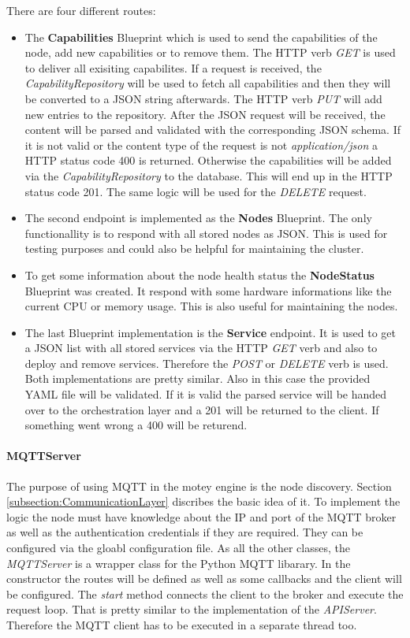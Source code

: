 There are four different routes:
\begin{itemize}
  \item The \textbf{Capabilities} Blueprint which is used to send the capabilities of the node, add new capabilities or to remove them.
  The \ac{HTTP} verb \textit{GET} is used to deliver all exisiting capabilites.
  If a request is received, the \textit{CapabilityRepository} will be used to fetch all capabilities and then they will be converted to a JSON string afterwards.
  The \ac{HTTP} verb \textit{PUT} will add new entries to the repository.
  After the \ac{JSON} request will be received, the content will be parsed and validated with the corresponding \ac{JSON} schema.
  If it is not valid or the content type of the request is not \textit{application/json} a \ac{HTTP} status code 400 is returned.
  Otherwise the capabilities will be added via the \textit{CapabilityRepository} to the database.
  This will end up in the \ac{HTTP} status code 201.
  The same logic will be used for the \textit{DELETE} request.
  \item The second endpoint is implemented as the \textbf{Nodes} Blueprint.
  The only functionallity is to respond with all stored nodes as \ac{JSON}.
  This is used for testing purposes and could also be helpful for maintaining the cluster.
  \item To get some information about the node health status the \textbf{NodeStatus} Blueprint was created.
  It respond with some hardware informations like the current \ac{CPU} or memory usage.
  This is also useful for maintaining the nodes.
  \item The last Blueprint implementation is the \textbf{Service} endpoint.
  It is used to get a \ac{JSON} list with all stored services via the \ac{HTTP} \textit{GET} verb and also to deploy and remove services.
  Therefore the \textit{POST} or \textit{DELETE} verb is used.
  Both implementations are pretty similar.
  Also in this case the provided \ac{YAML} file will be validated.
  If it is valid the parsed service will be handed over to the orchestration layer and a 201 will be returned to the client.
  If something went wrong a 400 will be returend.
\end{itemize}

\paragraph{MQTTServer}
The purpose of using \ac{MQTT} in the motey engine is the node discovery.
Section \ref{subsection:CommunicationLayer} discribes the basic idea of it.
To implement the logic the node must have knowledge about the \ac{IP} and port of the \ac{MQTT} broker as well as the authentication credentials if they are required.
They can be configured via the gloabl configuration file.
As all the other classes, the \textit{MQTTServer} is a wrapper class for the Python \ac{MQTT} libarary.
In the constructor the routes will be defined as well as some callbacks and the client will be configured.
The \textit{start} method connects the client to the broker and execute the request loop.
That is pretty similar to the implementation of the \textit{APIServer}.
Therefore the \ac{MQTT} client has to be executed in a separate thread too.

